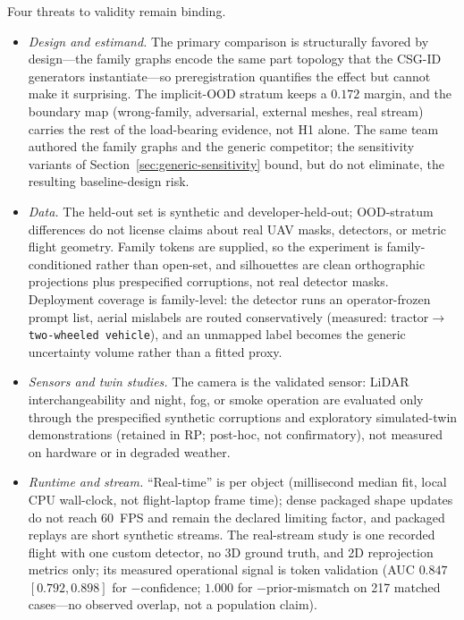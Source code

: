\documentclass[11pt,a4paper]{article}
\begin{document}
Four threats to validity remain binding.

\begin{itemize}
\item \emph{Design and estimand.} The primary comparison is structurally
favored by design---the family graphs encode the same part topology that the
CSG-ID generators instantiate---so preregistration quantifies the effect but
cannot make it surprising. The implicit-OOD stratum keeps a
\(0.172\) margin, and the boundary map (wrong-family,
adversarial, external meshes, real stream) carries the rest of the
load-bearing evidence, not H1 alone. The same
team authored the family graphs and the generic competitor; the sensitivity
variants of Section~\ref{sec:generic-sensitivity} bound, but do not
eliminate, the resulting baseline-design risk.
\item \emph{Data.} The held-out set is synthetic and developer-held-out;
OOD-stratum differences do not license claims about real UAV masks,
detectors, or metric flight geometry. Family tokens are supplied, so the
experiment is family-conditioned rather than open-set, and silhouettes are
clean orthographic projections plus prespecified corruptions, not real
detector masks. Deployment coverage is family-level: the detector runs an
operator-frozen prompt list, aerial
mislabels are routed conservatively (measured:
tractor\(\to\)\texttt{two-wheeled vehicle}), and an unmapped label becomes
the generic uncertainty volume rather than a fitted proxy.
\item \emph{Sensors and twin studies.} The camera is the validated sensor:
LiDAR interchangeability and night, fog, or smoke operation are evaluated
only through the prespecified synthetic corruptions and exploratory
simulated-twin demonstrations (retained in RP; post-hoc, not confirmatory),
not measured on hardware or in degraded weather.
\item \emph{Runtime and stream.} ``Real-time'' is per object (millisecond
median fit, local CPU wall-clock, not flight-laptop frame time); dense
packaged shape updates do not reach 60~FPS and remain the
declared limiting factor, and packaged replays are short synthetic streams. The
real-stream study is one recorded flight with one custom detector,
no 3D ground truth, and 2D reprojection metrics only;
its measured operational signal is token validation (AUC \(0.847\)
\([0.792,0.898]\) for \(-\)confidence; \(1.000\) for \(-\)prior-mismatch on
217 matched cases---no observed overlap, not a population
claim).
\end{itemize}
\end{document}

